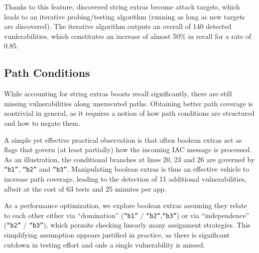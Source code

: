 Thanks to this feature, discovered string extras become attack targets, which leads to an iterative probing/testing algorithm (running as long as new targets are discovered). The iterative algorithm outputs an overall of 140 detected vunlerabilities, which constitutes an increase of almost 50\% in recall for a rate of 0.85.

\subsection{Path Conditions}

While accounting for string extras boosts recall significantly, there are still missing vulnerabilities along unexecuted paths. Obtaining better path coverage is nontrivial in general, as it requires a notion of how path conditions are structured and how to negate them.

A simple yet effective practical observation is that often boolean extras act as flags that govern (at least partially) how the incoming IAC message is processed. As an illustration,
the conditional branches at lines 20, 23 and 26 are governed by {\tt ``b1''}, {\tt ``b2''} and {\tt ``b3''}. Manipulating boolean extras is thus an effective vehicle to increase path coverage, leading to the detection of 11 additional vulnerabilities, albeit at the cost of 63 tests and 25 minutes per app.

As a performance optimization, we explore boolean extras assuming they relate to each other either via ``domination'' ({\tt ``b1''} / {\tt ``b2''},{\tt ``b3''}) or via ``independence''
({\tt ``b2''} / {\tt ``b3''}), which permits checking linearly many assignment strategies. This simplifying assumption appears justified in practice, as there is significant cutdown in testing effort and onle a single vulnerability is missed.